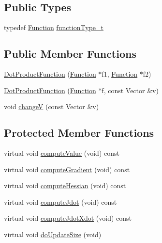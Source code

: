 \subsection*{Public Types}
\begin{DoxyCompactItemize}
\item 
typedef \hyperlink{classocra_1_1Function}{Function} \hyperlink{classocra_1_1DotProductFunction_abdc60b6380ffedc075792224bd908c48}{function\+Type\+\_\+t}
\end{DoxyCompactItemize}
\subsection*{Public Member Functions}
\begin{DoxyCompactItemize}
\item 
\hyperlink{classocra_1_1DotProductFunction_a70f7d2b9c9fefba0203fbee84607c9e9}{Dot\+Product\+Function} (\hyperlink{classocra_1_1Function}{Function} $\ast$f1, \hyperlink{classocra_1_1Function}{Function} $\ast$f2)
\item 
\hyperlink{classocra_1_1DotProductFunction_a369a245fec0cfe2d4f72bfd577ab7ad0}{Dot\+Product\+Function} (\hyperlink{classocra_1_1Function}{Function} $\ast$f, const Vector \&v)
\item 
void \hyperlink{classocra_1_1DotProductFunction_a2c7c65e80d7fb5ac1da43421a792f77b}{changeV} (const Vector \&v)
\end{DoxyCompactItemize}
\subsection*{Protected Member Functions}
\begin{DoxyCompactItemize}
\item 
virtual void \hyperlink{classocra_1_1DotProductFunction_a415bfa09ec30413293b80df1748d0dd0}{compute\+Value} (void) const 
\item 
virtual void \hyperlink{classocra_1_1DotProductFunction_a07cd95fa51e396c1a3aef189765053c5}{compute\+Gradient} (void) const 
\item 
virtual void \hyperlink{classocra_1_1DotProductFunction_a040c6e364fdd35f1ed408f8dad8ae2d0}{compute\+Hessian} (void) const 
\item 
virtual void \hyperlink{classocra_1_1DotProductFunction_af728aab5e5f3d8967255cf69a6431a74}{compute\+Jdot} (void) const 
\item 
virtual void \hyperlink{classocra_1_1DotProductFunction_ae4164c7c1998aeb5d3fdce27dc566da6}{compute\+Jdot\+Xdot} (void) const 
\item 
virtual void \hyperlink{classocra_1_1DotProductFunction_af943f9e456e44b3cbe108a964697f239}{do\+Update\+Size} (void)
\end{DoxyCompactItemize}
